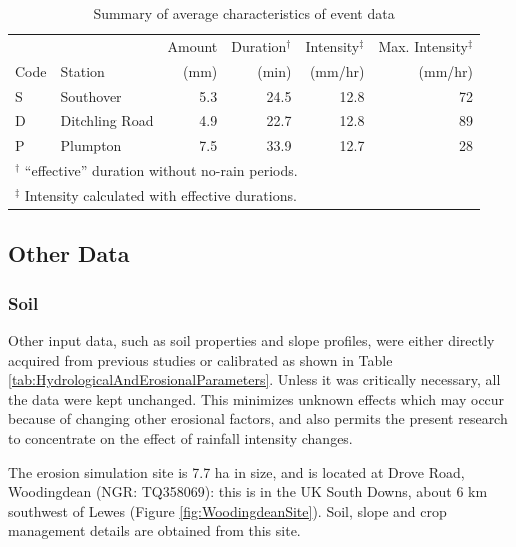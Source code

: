 \begin{table}[htbp]
\caption{Summary of average characteristics of event data}
\footnotesize
\centering
\begin{tabular}{llrrrr}
\toprule
 & & Amount & Duration$^\dagger$ & Intensity$^\ddag$ & Max. Intensity$^\ddag$
\\
Code & Station & (mm) & (min) & (mm/hr) & (mm/hr) \\ \midrule
S & Southover & 5.3 & 24.5 & 12.8 & 72 \\ \midrule
D & Ditchling Road & 4.9 & 22.7 & 12.8 & 89 \\ \midrule
P & Plumpton & 7.5 & 33.9 & 12.7 & 28 \\
\bottomrule
\multicolumn{6}{l}{$^\dag$ ``effective'' duration without no-rain periods.}\\
\multicolumn{6}{l}{$^\ddag$ Intensity calculated with effective durations.}
\end{tabular}
\label{tab:averagecharacteristicsofeventdata}
\end{table}

\subsection{Other Data}
\label{sec:OtherData}

\subsubsection{Soil}
\label{sec:Soil}

Other input data, such as soil properties and slope profiles, were either
directly acquired from previous studies \citep{favis-mortlock1998-141} or
calibrated as shown in Table \ref{tab:HydrologicalAndErosionalParameters}.
Unless it was critically necessary, all the data were kept unchanged. This
minimizes unknown effects which may occur because of changing other erosional
factors, and also permits the present research to concentrate on the effect of
rainfall intensity changes.

The erosion simulation site is 7.7 ha in size, and is located at Drove Road,
Woodingdean (NGR: TQ358069): this is in the UK South Downs, about 6 km southwest
of Lewes (Figure \ref{fig:WoodingdeanSite}). Soil, slope and crop management
details are obtained from this site.

